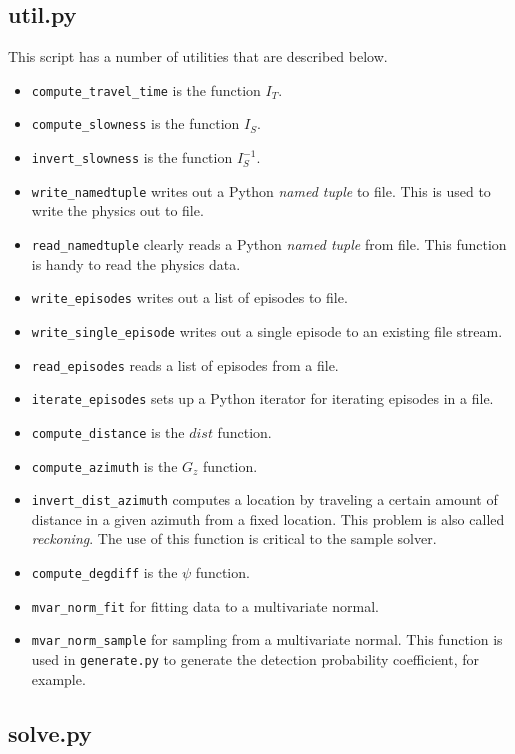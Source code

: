 \documentclass[12pt,letterpaper,onecolumn,oneside]{article}
\begin{document}
\begin{appendices}
\subsection{util.py}
This script has a number of utilities that are described below.
\begin{itemize}
\item {\tt compute\_travel\_time} is the function $I_T$.
\item {\tt compute\_slowness} is the function $I_S$.
\item {\tt invert\_slowness} is the function $I_S^{-1}$.
\item {\tt write\_namedtuple} writes out a Python {\em named tuple} to
  file. This is used to write the physics out to file.
\item {\tt read\_namedtuple} clearly reads a Python {\em named tuple}
  from file. This function is handy to read the physics data.
\item {\tt write\_episodes} writes out a list of episodes to file.
\item {\tt write\_single\_episode} writes out a single episode to an
  existing file stream.
\item {\tt read\_episodes} reads a list of episodes from a file.
\item {\tt iterate\_episodes} sets up a Python iterator for iterating
  episodes in a file.
\item {\tt compute\_distance} is the $dist$ function.
\item {\tt compute\_azimuth} is the $G_z$ function.
\item {\tt invert\_dist\_azimuth} computes a location by traveling a
  certain amount of distance in a given azimuth from a fixed
  location. This problem is also called {\em reckoning}. The use of this
  function is critical to the sample solver.
\item {\tt compute\_degdiff} is the $\psi$ function.
\item {\tt mvar\_norm\_fit} for fitting data to a multivariate normal.
\item {\tt mvar\_norm\_sample} for sampling from a multivariate
  normal. This function is used in {\tt generate.py} to generate the
  detection probability coefficient, for example.
\end{itemize}

\subsection{solve.py}


\end{appendices}
\end{document}
